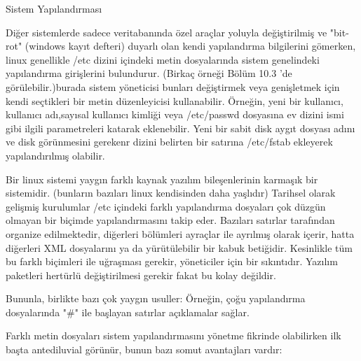 \begin{section}{Sistem Yapılandırması}

Diğer sistemlerde sadece veritabanında özel araçlar yoluyla değiştirilmiş ve "bit-rot" (windows kayıt defteri) duyarlı  olan  kendi yapılandırma bilgilerini gömerken,  linux genellikle /etc dizini içindeki metin dosyalarında sistem genelindeki yapılandırma girişlerini bulundurur. (Birkaç örneği Bölüm 10.3 'de görülebilir.)burada sistem yöneticisi bunları değiştirmek veya genişletmek için kendi seçtikleri bir metin düzenleyicisi kullanabilir. Örneğin, yeni bir kullanıcı, kullanıcı adı,sayısal kullanıcı kimliği veya /etc/passwd dosyasına ev dizini ismi gibi ilgili parametreleri katarak eklenebilir. Yeni bir sabit disk aygıt dosyası adını ve disk görünmesini gerekenr dizini belirten bir satırına /etc/fstab ekleyerek yapılandırılmış olabilir.

Bir linux sistemi yaygın farklı kaynak yazılım bileşenlerinin karmaşık bir sistemidir. (bunların bazıları linux kendisinden daha yaşlıdır) Tarihsel olarak gelişmiş kurulumlar  /etc içindeki farklı yapılandırma dosyaları çok düzgün olmayan bir biçimde yapılandırmasını takip eder. Bazıları satırlar tarafından organize edilmektedir, diğerleri bölümleri ayraçlar ile ayrılmış olarak içerir, hatta diğerleri XML dosyalarını ya da yürütülebilir bir kabuk betiğidir. Kesinlikle tüm bu farklı biçimleri ile uğraşması gerekir, yöneticiler  için bir sıkıntıdır. Yazılım paketleri hertürlü değiştirilmesi gerekir fakat bu kolay değildir.

Bununla, birlikte bazı çok yaygın usuller: Örneğin, çoğu yapılandırma dosyalarında "\#" ile başlayan satırlar açıklamalar sağlar.

Farklı metin dosyaları sistem yapılandırmasını yönetme fikrinde olabilirken ilk başta antediluvial görünür, bunun bazı somut avantajları vardır:


\end{section}
